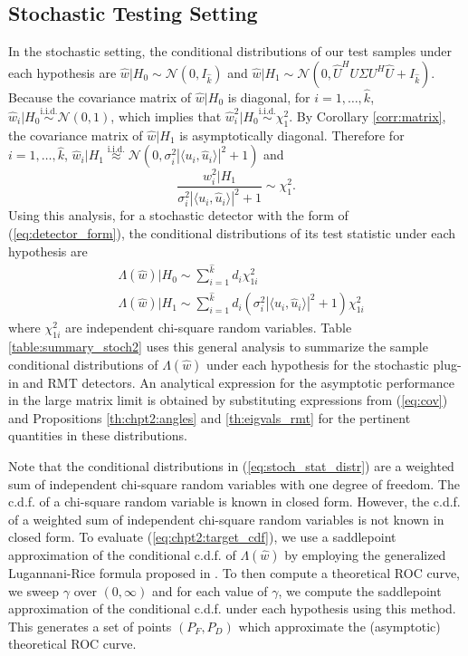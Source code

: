 \subsection{Stochastic Testing Setting}\label{sec:ieee_msd_roc_stoch}
In the stochastic setting, the conditional distributions of our test samples under each hypothesis are $\widehat{w}|H_0\sim\mathcal{N}(0,I_{\widehat{k}})$ and $\widehat{w}|H_1\sim\mathcal{N}(0,\widehat{U}^HU\Sigma U^H\widehat{U}+I_{\widehat{k}})$. Because the covariance matrix of $\widehat{w}|H_0$ is diagonal, for $i=1,\dots,\widehat{k}$, $\widehat{w}_i|H_0\overset{\text{i.i.d}.}{\sim}\mathcal{N}(0,1)$, which implies that $\widehat{w}_i^2|H_0\overset{\text{i.i.d.}}{\sim}\chi_1^2$. By Corollary \ref{corr:matrix}, the covariance matrix of $\widehat{w}|H_1$ is asymptotically diagonal. Therefore for $i=1,\dots,\widehat{k}$, $\widehat{w}_i|H_1\overset{\text{i.i.d.}}{\approx}\mathcal{N}(0,\sigma^2_i|\langle u_i,\widehat{u}_i\rangle|^2+1)$ and
\begin{equation*}
\frac{w_i^2|H_1}{\sigma^2_i|\langle u_i,\widehat{u}_i\rangle|^2+1}\sim\chi_1^2.
\end{equation*}
Using this analysis, for a stochastic detector with the form of (\ref{eq:detector_form}), the conditional distributions of its test statistic under each hypothesis are
\small\begin{equation}\label{eq:stoch_stat_distr}
\begin{aligned}
&\Lambda(\widehat{w})|H_0 \sim \sum_{i=1}^{\widehat{k}} d_i\chi_{1i}^2 \\
&\Lambda(\widehat{w})|H_1\sim\sum_{i=1}^{\widehat{k}}d_i(\sigma^2_i|\langle u_i,\widehat{u}_i\rangle|^2+1)\chi_{1i}^2
\end{aligned}
\end{equation}\normalsize
where $\chi_{1i}^2$ are independent chi-square random variables. Table \ref{table:summary_stoch2} uses this general analysis to summarize the sample conditional distributions of $\Lambda(\widehat{w})$ under each hypothesis for the stochastic plug-in and RMT detectors.  An analytical expression for the asymptotic performance in the large matrix limit  is obtained by substituting expressions from (\ref{eq:cov}) and Propositions \ref{th:chpt2:angles} and \ref{th:eigvals_rmt} for the pertinent quantities in these distributions.

Note that the conditional distributions in (\ref{eq:stoch_stat_distr}) are a weighted sum of independent chi-square random variables with one degree of freedom. The c.d.f. of a chi-square random variable is known in closed form. However, the c.d.f. of a weighted sum of independent chi-square random variables is not known in closed form. To evaluate (\ref{eq:chpt2:target_cdf}), we use a saddlepoint approximation of the conditional c.d.f. of $\Lambda(\widehat{w})$ by employing the generalized Lugannani-Rice formula proposed in \cite{wood1993saddlepoint}. To then compute a theoretical ROC curve, we sweep $\gamma$ over $(0,\infty)$ and for each value of $\gamma$, we compute the saddlepoint approximation of the conditional c.d.f. under each hypothesis using this method. This generates a set of points $(P_F,P_D)$ which approximate the (asymptotic) theoretical ROC curve.

